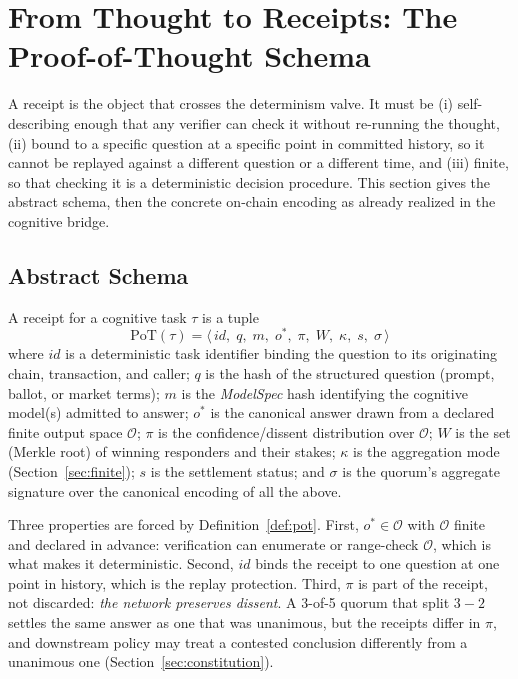 \section{From Thought to Receipts: The Proof-of-Thought Schema}
\label{sec:receipts}

A \PoT{} receipt is the object that crosses the determinism valve. It must be (i) self-describing enough that any verifier can check it without re-running the thought, (ii) bound to a specific question at a specific point in committed history, so it cannot be replayed against a different question or a different time, and (iii) finite, so that checking it is a deterministic decision procedure. This section gives the abstract schema, then the concrete on-chain encoding as already realized in the \Lux{} cognitive bridge.

\subsection{Abstract Schema}

\begin{definition}
\label{def:pot}
A \PoT{} receipt for a cognitive task $\tau$ is a tuple
\[
\mathrm{PoT}(\tau) = \big\langle\, \mathit{id},\; q,\; m,\; o^\ast,\; \pi,\; W,\; \kappa,\; s,\; \sigma \,\big\rangle
\]
where $\mathit{id}$ is a deterministic task identifier binding the question to its originating chain, transaction, and caller; $q$ is the hash of the structured question (prompt, ballot, or market terms); $m$ is the \emph{ModelSpec} hash identifying the cognitive model(s) admitted to answer; $o^\ast$ is the canonical answer drawn from a declared finite output space $\mathcal{O}$; $\pi$ is the confidence/dissent distribution over $\mathcal{O}$; $W$ is the set (Merkle root) of winning responders and their stakes; $\kappa$ is the aggregation mode (Section~\ref{sec:finite}); $s$ is the settlement status; and $\sigma$ is the quorum's aggregate signature over the canonical encoding of all the above.
\end{definition}

Three properties are forced by Definition~\ref{def:pot}. First, $o^\ast \in \mathcal{O}$ with $\mathcal{O}$ finite and declared in advance: verification can enumerate or range-check $\mathcal{O}$, which is what makes it deterministic. Second, $\mathit{id}$ binds the receipt to one question at one point in history, which is the replay protection. Third, $\pi$ is part of the receipt, not discarded: \emph{the network preserves dissent}. A 3-of-5 quorum that split $3{-}2$ settles the same answer as one that was unanimous, but the receipts differ in $\pi$, and downstream policy may treat a contested conclusion differently from a unanimous one (Section~\ref{sec:constitution}).

